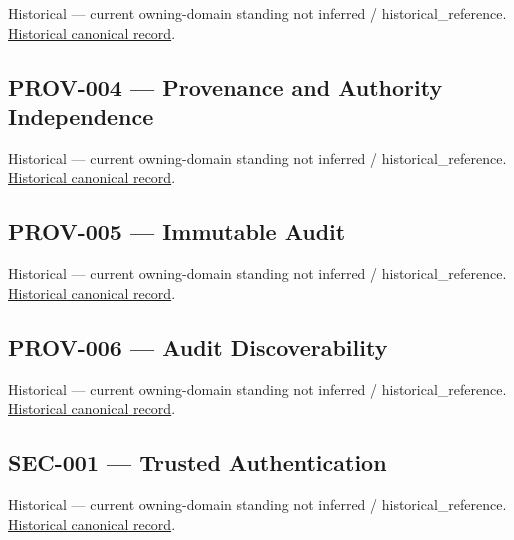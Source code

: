 \par\label{element:c016286faa3d4dfbbad133f73e855f1c}
Historical — current owning-domain standing not inferred / historical\_reference. \href{../../../../continuum/motivation/requirement/c016286faa3d4dfbbad133f73e855f1c.md}{Historical canonical record}.\par

\subsection{PROV-004 — Provenance and Authority Independence}

\par\label{element:3fb9a89d345a4cb6a56d62823316664e}
Historical — current owning-domain standing not inferred / historical\_reference. \href{../../../../continuum/motivation/requirement/3fb9a89d345a4cb6a56d62823316664e.md}{Historical canonical record}.\par

\subsection{PROV-005 — Immutable Audit}

\par\label{element:0f7b23cfd94e450c8a2772879bc9bb1e}
Historical — current owning-domain standing not inferred / historical\_reference. \href{../../../../continuum/motivation/requirement/0f7b23cfd94e450c8a2772879bc9bb1e.md}{Historical canonical record}.\par

\subsection{PROV-006 — Audit Discoverability}

\par\label{element:927c65d2d665451396782b4c1d7c8c86}
Historical — current owning-domain standing not inferred / historical\_reference. \href{../../../../continuum/motivation/requirement/927c65d2d665451396782b4c1d7c8c86.md}{Historical canonical record}.\par

\subsection{SEC-001 — Trusted Authentication}

\par\label{element:e4998b0a132c41afbe610b11869c3297}
Historical — current owning-domain standing not inferred / historical\_reference. \href{../../../../continuum/motivation/requirement/e4998b0a132c41afbe610b11869c3297.md}{Historical canonical record}.\par

